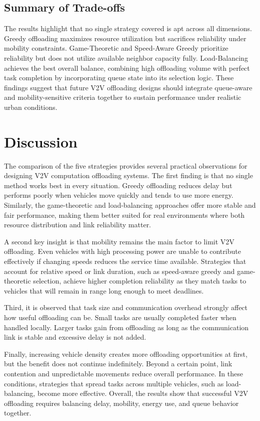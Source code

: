 \documentclass[conference]{IEEEtran}
\begin{document}
\subsection{Summary of Trade-offs}
The results highlight that no single strategy covered is apt across all dimensions. Greedy offloading maximizes resource utilization but sacrifices reliability under mobility constraints. Game-Theoretic and Speed-Aware Greedy prioritize reliability but does not utilize available neighbor capacity fully. Load-Balancing achieves the best overall balance, combining high offloading volume with perfect task completion by incorporating queue state into its selection logic. These findings suggest that future V2V offloading designs should integrate queue-aware and mobility-sensitive criteria together to sustain performance under realistic urban conditions.
 
\section{Discussion}
The comparison of the five strategies provides several practical observations for designing V2V computation offloading systems. The first finding is that no single method works best in every situation. Greedy offloading reduces delay but performs poorly when vehicles move quickly and tends to use more energy. Similarly, the game-theoretic and load-balancing approaches offer more stable and fair performance, making them better suited for real environments where both resource distribution and link reliability matter.
 
A second key insight is that mobility remains the main factor to limit V2V offloading. Even vehicles with high processing power are unable to contribute effectively if changing speeds reduces the service time available. Strategies that account for relative speed or link duration, such as speed-aware greedy and game-theoretic selection, achieve higher completion reliability as they match tasks to vehicles that will remain in range long enough to meet deadlines.
 
Third, it is observed that task size and communication overhead strongly affect how useful offloading can be. Small tasks are usually completed faster when handled locally. Larger tasks gain from offloading as long as the communication link is stable and excessive delay is not added.
 
Finally, increasing vehicle density creates more offloading opportunities at first, but the benefit does not continue indefinitely. Beyond a certain point, link contention and unpredictable movements reduce overall performance. In these conditions, strategies that spread tasks across multiple vehicles, such as load-balancing, become more effective. Overall, the results show that successful V2V offloading requires balancing delay, mobility, energy use, and queue behavior together.
 
\end{document}
